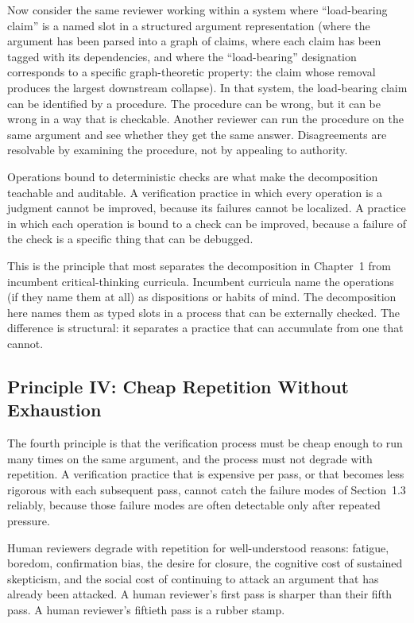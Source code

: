 \documentclass[11pt]{article}
\begin{document}
Now consider the same reviewer working within a system where ``load-bearing claim'' is a named slot in a structured argument representation (where the argument has been parsed into a graph of claims, where each claim has been tagged with its dependencies, and where the ``load-bearing'' designation corresponds to a specific graph-theoretic property: the claim whose removal produces the largest downstream collapse). In that system, the load-bearing claim can be identified by a procedure. The procedure can be wrong, but it can be wrong in a way that is checkable. Another reviewer can run the procedure on the same argument and see whether they get the same answer. Disagreements are resolvable by examining the procedure, not by appealing to authority.

Operations bound to deterministic checks are what make the decomposition teachable and auditable. A verification practice in which every operation is a judgment cannot be improved, because its failures cannot be localized. A practice in which each operation is bound to a check can be improved, because a failure of the check is a specific thing that can be debugged.

This is the principle that most separates the decomposition in Chapter~1 from incumbent critical-thinking curricula. Incumbent curricula name the operations (if they name them at all) as dispositions or habits of mind. The decomposition here names them as typed slots in a process that can be externally checked. The difference is structural: it separates a practice that can accumulate from one that cannot.

\subsection{Principle IV: Cheap Repetition Without Exhaustion}

The fourth principle is that the verification process must be cheap enough to run many times on the same argument, and the process must not degrade with repetition. A verification practice that is expensive per pass, or that becomes less rigorous with each subsequent pass, cannot catch the failure modes of Section~1.3 reliably, because those failure modes are often detectable only after repeated pressure.

Human reviewers degrade with repetition for well-understood reasons: fatigue, boredom, confirmation bias, the desire for closure, the cognitive cost of sustained skepticism, and the social cost of continuing to attack an argument that has already been attacked. A human reviewer's first pass is sharper than their fifth pass. A human reviewer's fiftieth pass is a rubber stamp.
\end{document}
